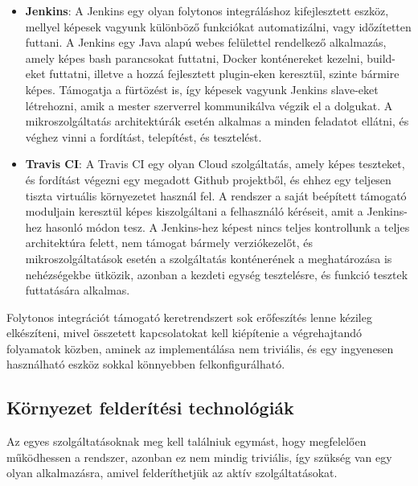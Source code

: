 \documentclass[11pt,magyar,a4paper,twoside,]{report}
\begin{document}
\begin{itemize}
\item
  \textbf{Jenkins}\citep{jenkins}: A Jenkins egy olyan folytonos
  integráláshoz kifejlesztett eszköz, mellyel képesek vagyunk különböző
  funkciókat automatizálni, vagy időzítetten futtani. A Jenkins egy Java
  alapú webes felülettel rendelkező alkalmazás, amely képes bash
  parancsokat futtatni, Docker konténereket kezelni, build-eket
  futtatni, illetve a hozzá fejlesztett plugin-eken keresztül, szinte
  bármire képes. Támogatja a fürtözést is, így képesek vagyunk Jenkins
  slave-eket létrehozni, amik a mester szerverrel kommunikálva végzik el
  a dolgukat. A mikroszolgáltatás architektúrák esetén alkalmas a minden
  feladatot ellátni, és véghez vinni a fordítást, telepítést, és
  tesztelést.
\item
  \textbf{Travis CI}\citep{travis}: A Travis CI egy olyan Cloud
  szolgáltatás, amely képes teszteket, és fordítást végezni egy megadott
  Github projektből, és ehhez egy teljesen tiszta virtuális környezetet
  használ fel. A rendszer a saját beépített támogató moduljain keresztül
  képes kiszolgáltani a felhasználó kéréseit, amit a Jenkins-hez hasonló
  módon tesz. A Jenkins-hez képest nincs teljes kontrollunk a teljes
  architektúra felett, nem támogat bármely verziókezelőt, és
  mikroszolgáltatások esetén a szolgáltatás konténerének a meghatározása
  is nehézségekbe ütközik, azonban a kezdeti egység tesztelésre, és
  funkció tesztek futtatására alkalmas.
\end{itemize}

Folytonos integrációt támogató keretrendszert sok erőfeszítés lenne
kézileg elkészíteni, mivel összetett kapcsolatokat kell kiépítenie a
végrehajtandó folyamatok közben, aminek az implementálása nem triviális,
és egy ingyenesen használható eszköz sokkal könnyebben
felkonfigurálható.

\subsection{Környezet felderítési
technológiák}\label{kuxf6rnyezet-felderuxedtuxe9si-technoluxf3giuxe1k}

Az egyes szolgáltatásoknak meg kell találniuk egymást, hogy megfelelően
működhessen a rendszer, azonban ez nem mindig triviális, így szükség van
egy olyan alkalmazásra, amivel felderíthetjük az aktív szolgáltatásokat.
\end{document}
